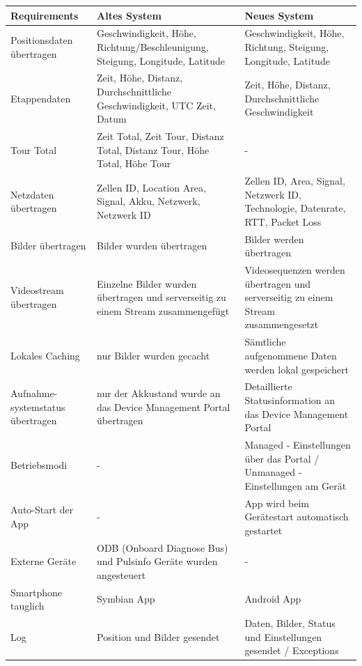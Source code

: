 {\renewcommand{\arraystretch}{2}%
    \begin{longtable}{  p{3.5cm} | p{4.3cm} | p{4.3cm} }
    
    \textbf{Requirements} & \textbf{Altes System} & \textbf{Neues System} \\ \hline
\hline
    Positionsdaten übertragen & Geschwindigkeit, H\"{o}he, Richtung/Beschleunigung, Steigung, Longitude, Latitude & Geschwindigkeit, H\"{o}he, Richtung, Steigung, Longitude, Latitude \\ \hline
    Etappendaten & Zeit, Höhe, Distanz, Durchschnittliche Geschwindigkeit, UTC Zeit, Datum & Zeit, Höhe, Distanz, Durchschnittliche Geschwindigkeit \\
    \hline
     Tour Total & Zeit Total, Zeit Tour, Distanz Total, Distanz Tour, Höhe Total, H\"{o}he Tour & - \\
    \hline
    Netzdaten übertragen & Zellen ID, Location Area, Signal, Akku, Netzwerk, Netzwerk ID & Zellen ID, Area, Signal, Netzwerk ID, Technologie, Datenrate, RTT, Packet Loss\\
    \hline
    Bilder \"{u}bertragen & Bilder wurden \"{u}bertragen & Bilder werden \"{u}bertragen\\
    \hline
    Videostream \"{u}bertragen & Einzelne Bilder wurden \"{u}bertragen und serverseitig zu einem Stream zusammengef\"{u}gt & Videosequenzen werden \"{u}bertragen und serverseitig zu einem Stream zusammengesetzt\\
    \hline
    Lokales Caching & nur Bilder wurden gecacht & S\"{a}mtliche aufgenommene Daten werden lokal gespeichert\\
    \hline
	Aufnahme- systemstatus \"{u}bertragen & nur der Akkustand wurde an das Device Management Portal \"{u}bertragen & Detaillierte Statusinformation an das Device Management Portal\\
    \hline    
    Betriebsmodi & - & Managed - Einstellungen \"{u}ber das Portal / Unmanaged - Einstellungen am Ger\"{a}t\\
    \hline
	Auto-Start der App & - & App wird beim Ger\"{a}testart automatisch gestartet\\
    \hline    
    Externe Ger\"{a}te & ODB (Onboard Diagnose Bus) und Pulsinfo Ger\"{a}te wurden angesteuert & -\\
    \hline  
    Smartphone tauglich & Symbian App & Android App\\
    \hline 
    Log & Position und Bilder gesendet & Daten, Bilder, Status und Einstellungen gesendet / Exceptions\\

\end{longtable}}
